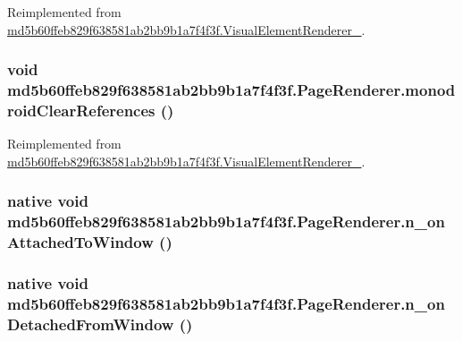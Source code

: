 Reimplemented from \hyperlink{classmd5b60ffeb829f638581ab2bb9b1a7f4f3f_1_1_visual_element_renderer__1_321b2967faff34b0f7971f55915f583e}{md5b60ffeb829f638581ab2bb9b1a7f4f3f.VisualElementRenderer\_}.\hypertarget{classmd5b60ffeb829f638581ab2bb9b1a7f4f3f_1_1_page_renderer_c993d3d981957dbc682a298a20ceda2b}{
\subsubsection[{monodroidClearReferences}]{\setlength{\rightskip}{0pt plus 5cm}void md5b60ffeb829f638581ab2bb9b1a7f4f3f.PageRenderer.monodroidClearReferences ()}}
\label{classmd5b60ffeb829f638581ab2bb9b1a7f4f3f_1_1_page_renderer_c993d3d981957dbc682a298a20ceda2b}




Reimplemented from \hyperlink{classmd5b60ffeb829f638581ab2bb9b1a7f4f3f_1_1_visual_element_renderer__1_4a1c180026d8eab71549e47b7de4b9b8}{md5b60ffeb829f638581ab2bb9b1a7f4f3f.VisualElementRenderer\_}.\hypertarget{classmd5b60ffeb829f638581ab2bb9b1a7f4f3f_1_1_page_renderer_4eec70029c094a9d58a5dc091fef3ebf}{
\subsubsection[{n\_\-onAttachedToWindow}]{\setlength{\rightskip}{0pt plus 5cm}native void md5b60ffeb829f638581ab2bb9b1a7f4f3f.PageRenderer.n\_\-onAttachedToWindow ()}}
\label{classmd5b60ffeb829f638581ab2bb9b1a7f4f3f_1_1_page_renderer_4eec70029c094a9d58a5dc091fef3ebf}


\hypertarget{classmd5b60ffeb829f638581ab2bb9b1a7f4f3f_1_1_page_renderer_940e352be04c4028a06fcdb63e29ed52}{
\subsubsection[{n\_\-onDetachedFromWindow}]{\setlength{\rightskip}{0pt plus 5cm}native void md5b60ffeb829f638581ab2bb9b1a7f4f3f.PageRenderer.n\_\-onDetachedFromWindow ()}}
\label{classmd5b60ffeb829f638581ab2bb9b1a7f4f3f_1_1_page_renderer_940e352be04c4028a06fcdb63e29ed52}


